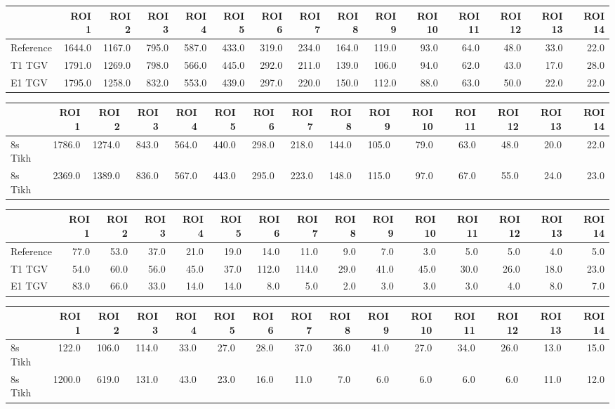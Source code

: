 \begin{tabular}{lrrrrrrrrrrrrrr}
\toprule
{} &   ROI 1 &   ROI 2 &  ROI 3 &  ROI 4 &  ROI 5 &  ROI 6 &  ROI 7 &  ROI 8 &  ROI 9 &  ROI 10 &  ROI 11 &  ROI 12 &  ROI 13 &  ROI 14 \\
\midrule
Reference &  1644.0 &  1167.0 &  795.0 &  587.0 &  433.0 &  319.0 &  234.0 &  164.0 &  119.0 &    93.0 &    64.0 &    48.0 &    33.0 &    22.0 \\
T1 TGV    &  1791.0 &  1269.0 &  798.0 &  566.0 &  445.0 &  292.0 &  211.0 &  139.0 &  106.0 &    94.0 &    62.0 &    43.0 &    17.0 &    28.0 \\
E1 TGV    &  1795.0 &  1258.0 &  832.0 &  553.0 &  439.0 &  297.0 &  220.0 &  150.0 &  112.0 &    88.0 &    63.0 &    50.0 &    22.0 &    22.0 \\
\bottomrule
\end{tabular}
\begin{tabular}{lrrrrrrrrrrrrrr}
\toprule
{} &   ROI 1 &   ROI 2 &  ROI 3 &  ROI 4 &  ROI 5 &  ROI 6 &  ROI 7 &  ROI 8 &  ROI 9 &  ROI 10 &  ROI 11 &  ROI 12 &  ROI 13 &  ROI 14 \\
\midrule
8s Tikh &  1786.0 &  1274.0 &  843.0 &  564.0 &  440.0 &  298.0 &  218.0 &  144.0 &  105.0 &    79.0 &    63.0 &    48.0 &    20.0 &    22.0 \\
8s Tikh &  2369.0 &  1389.0 &  836.0 &  567.0 &  443.0 &  295.0 &  223.0 &  148.0 &  115.0 &    97.0 &    67.0 &    55.0 &    24.0 &    23.0 \\
\bottomrule
\end{tabular}
\begin{tabular}{lrrrrrrrrrrrrrr}
\toprule
{} &  ROI 1 &  ROI 2 &  ROI 3 &  ROI 4 &  ROI 5 &  ROI 6 &  ROI 7 &  ROI 8 &  ROI 9 &  ROI 10 &  ROI 11 &  ROI 12 &  ROI 13 &  ROI 14 \\
\midrule
Reference &   77.0 &   53.0 &   37.0 &   21.0 &   19.0 &   14.0 &   11.0 &    9.0 &    7.0 &     3.0 &     5.0 &     5.0 &     4.0 &     5.0 \\
T1 TGV    &   54.0 &   60.0 &   56.0 &   45.0 &   37.0 &  112.0 &  114.0 &   29.0 &   41.0 &    45.0 &    30.0 &    26.0 &    18.0 &    23.0 \\
E1 TGV    &   83.0 &   66.0 &   33.0 &   14.0 &   14.0 &    8.0 &    5.0 &    2.0 &    3.0 &     3.0 &     3.0 &     4.0 &     8.0 &     7.0 \\
\bottomrule
\end{tabular}
\begin{tabular}{lrrrrrrrrrrrrrr}
\toprule
{} &   ROI 1 &  ROI 2 &  ROI 3 &  ROI 4 &  ROI 5 &  ROI 6 &  ROI 7 &  ROI 8 &  ROI 9 &  ROI 10 &  ROI 11 &  ROI 12 &  ROI 13 &  ROI 14 \\
\midrule
8s Tikh &   122.0 &  106.0 &  114.0 &   33.0 &   27.0 &   28.0 &   37.0 &   36.0 &   41.0 &    27.0 &    34.0 &    26.0 &    13.0 &    15.0 \\
8s Tikh &  1200.0 &  619.0 &  131.0 &   43.0 &   23.0 &   16.0 &   11.0 &    7.0 &    6.0 &     6.0 &     6.0 &     6.0 &    11.0 &    12.0 \\
\bottomrule
\end{tabular}
